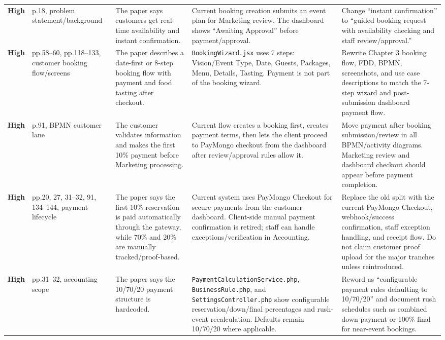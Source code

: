 \documentclass[11pt]{article}
\newcommand{\severityhigh}{\textcolor{high}{\textbf{High}}}
\begin{document}
\begin{landscape}
\begin{longtable}{L{0.72in} L{1.05in} L{2.05in} L{2.55in} L{2.55in}}
\severityhigh & p.18, problem statement/background & The paper says customers get real-time availability and instant confirmation. & Current booking creation submits an event plan for Marketing review. The dashboard shows ``Awaiting Approval'' before payment/approval. & Change ``instant confirmation'' to ``guided booking request with availability checking and staff review/approval.'' \\

\severityhigh & pp.58--60, pp.118--133, customer booking flow/screens & The paper describes a date-first or 8-step booking flow with payment and food tasting after checkout. & \texttt{BookingWizard.jsx} uses 7 steps: Vision/Event Type, Date, Guests, Packages, Menu, Details, Tasting. Payment is not part of the booking wizard. & Rewrite Chapter 3 booking flow, FDD, BPMN, screenshots, and use case descriptions to match the 7-step wizard and post-submission dashboard payment flow. \\

\severityhigh & p.91, BPMN customer lane & The customer validates information and makes the first 10\% payment before Marketing processing. & Current flow creates a booking first, creates payment terms, then lets the client proceed to PayMongo checkout from the dashboard after review/approval rules allow it. & Move payment after booking submission/review in all BPMN/activity diagrams. Marketing review and dashboard checkout should appear before payment completion. \\

\severityhigh & pp.20, 27, 31--32, 91, 134--144, payment lifecycle & The paper says the first 10\% reservation is paid automatically through the gateway, while 70\% and 20\% are manually tracked/proof-based. & Current system uses PayMongo Checkout for secure payments from the customer dashboard. Client-side manual payment confirmation is retired; staff can handle exceptions/verification in Accounting. & Replace the old split with the current PayMongo Checkout, webhook/success confirmation, staff exception handling, and receipt flow. Do not claim customer proof upload for the major tranches unless reintroduced. \\

\severityhigh & pp.31--32, accounting scope & The paper says the 10/70/20 payment structure is hardcoded. & \texttt{PaymentCalculationService.php}, \texttt{BusinessRule.php}, and \texttt{SettingsController.php} show configurable reservation/down/final percentages and rush-event recalculation. Defaults remain 10/70/20 where applicable. & Reword as ``configurable payment rules defaulting to 10/70/20'' and document rush schedules such as combined down payment or 100\% final for near-event bookings. \\


\end{longtable}
\end{landscape}
\end{document}
